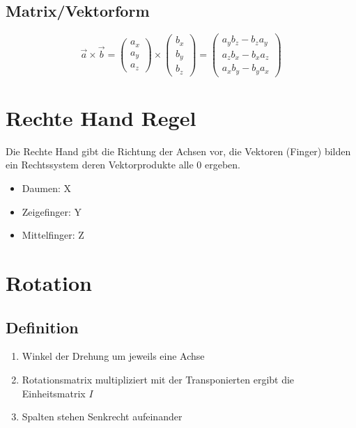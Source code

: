 \subsection{Matrix/Vektorform}

\begin{equation}
\vec{a} \times \vec{b} = 
\left(
\begin{array}{c}
a_{x} \\
a_{y} \\
a_{z}
\end{array}
\right)
\times
\left(
\begin{array}{c}
b_{x} \\
b_{y} \\
b_{z}				
\end{array}
\right)
= 
\left(
\begin{array}{c}
a_{y}b_{z} - b_{z}a_{y} \\
a_{z}b_{x} - b_{x}a_{z} \\
a_{x}b_{y} - b_{y}a_{x}  
\end{array}
\right)				
\end{equation}

\section{Rechte Hand Regel}
\label{chp:MathematischeGrundlagen:sec:RechteHandRegel}
	Die Rechte Hand gibt die Richtung der Achsen vor, die Vektoren (Finger) bilden ein Rechtssystem deren Vektorprodukte alle 0 ergeben.
	\begin{itemize}
		\item Daumen: X
		\item Zeigefinger: Y
		\item Mittelfinger: Z
	\end{itemize}


\section{Rotation}
\label{chp:MathematischeGrundlagen:sec:Rotation}

\subsection{Definition}
\begin{enumerate}
	\item Winkel der Drehung um jeweils eine Achse
	\item Rotationsmatrix multipliziert mit der Transponierten ergibt die Einheitsmatrix $I$
	\item Spalten stehen Senkrecht aufeinander
\end{enumerate}

